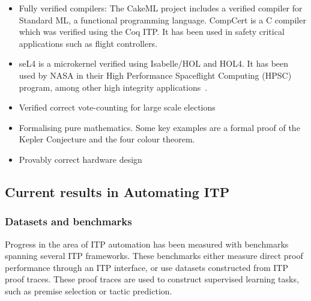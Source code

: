 \documentclass{article}
\begin{document}
    \begin{itemize}
        \item Fully verified compilers:
        The CakeML\cite{tan_verified_2019} project includes a verified compiler for Standard ML\cite{milner_definition_1997}, a functional programming language.
        CompCert\cite{leroy_compcert_2014} is a C compiler which was verified using the Coq ITP\@.
        It has been used in safety critical applications such as flight controllers\cite{franca_formally_2012}.
        \item seL4\cite{klein_sel4_2009} is a microkernel verified using Isabelle/HOL and HOL4\cite{heiser_sel4_2020}.
        It has been used by NASA in their High Performance Spaceflight Computing (HPSC) program\cite{noauthor_nasa_nodate}, among other high integrity applications~\cite{vanderleest_is_2018,matos_sel4_2022,heiser_sel4_australia_2020}.
        \item Verified correct vote-counting for large scale elections\cite{moses_no_2017}
        \item Formalising pure mathematics.
        Some key examples are a formal proof of the Kepler Conjecture\cite{hales_formal_2017} and the four colour theorem\cite{gonthier_four_2008}.
        \item Provably correct hardware design\cite{gupta_formal_1992,kern_formal_2002}
    \end{itemize}

    \subsection{Current results in Automating ITP}\label{subsec:current-results-in-automating-itp}

    \subsubsection{Datasets and benchmarks}
    Progress in the area of ITP automation has been measured with benchmarks spanning several ITP frameworks.
    These benchmarks either measure direct proof performance through an ITP interface, or use datasets constructed from ITP proof traces.
    These proof traces are used to construct supervised learning tasks, such as premise selection or tactic prediction. \\
\end{document}
